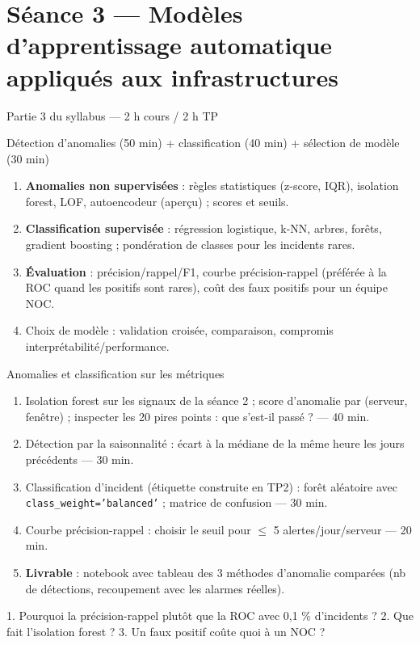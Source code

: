 \documentclass[11pt,a4paper]{article}
\begin{document}
\section*{Séance 3 — Modèles d'apprentissage automatique appliqués aux infrastructures}
\begin{seancebox}{Partie 3 du syllabus — 2 h cours / 2 h TP}
\end{seancebox}
\begin{coursbox}{Détection d'anomalies (50 min) + classification (40 min) + sélection de modèle (30 min)}
\begin{enumerate}[nosep]
\item \textbf{Anomalies non supervisées} : règles statistiques (z-score, IQR), isolation forest, LOF, autoencodeur (aperçu) ; scores et seuils.
\item \textbf{Classification supervisée} : régression logistique, k-NN, arbres, forêts, gradient boosting ; pondération de classes pour les incidents rares.
\item \textbf{Évaluation} : précision/rappel/F1, courbe précision-rappel (préférée à la ROC quand les positifs sont rares), coût des faux positifs pour un équipe NOC.
\item Choix de modèle : validation croisée, comparaison, compromis interprétabilité/performance.
\end{enumerate}
\end{coursbox}
\begin{tpbox}{Anomalies et classification sur les métriques}
\begin{enumerate}[nosep]
\item Isolation forest sur les signaux de la séance 2 ; score d'anomalie par (serveur, fenêtre) ; inspecter les 20 pires points : que s'est-il passé ? — 40 min.
\item Détection par la saisonnalité : écart à la médiane de la même heure les jours précédents — 30 min.
\item Classification d'incident (étiquette construite en TP2) : forêt aléatoire avec \texttt{class\_weight='balanced'} ; matrice de confusion — 30 min.
\item Courbe précision-rappel : choisir le seuil pour $\le$ 5 alertes/jour/serveur — 20 min.
\item \textbf{Livrable} : notebook avec tableau des 3 méthodes d'anomalie comparées (nb de détections, recoupement avec les alarmes réelles).
\end{enumerate}
\end{tpbox}
\begin{evalbox}
1. Pourquoi la précision-rappel plutôt que la ROC avec 0,1 \% d'incidents ? 2. Que fait l'isolation forest ? 3. Un faux positif coûte quoi à un NOC ?
\end{evalbox}
\end{document}
